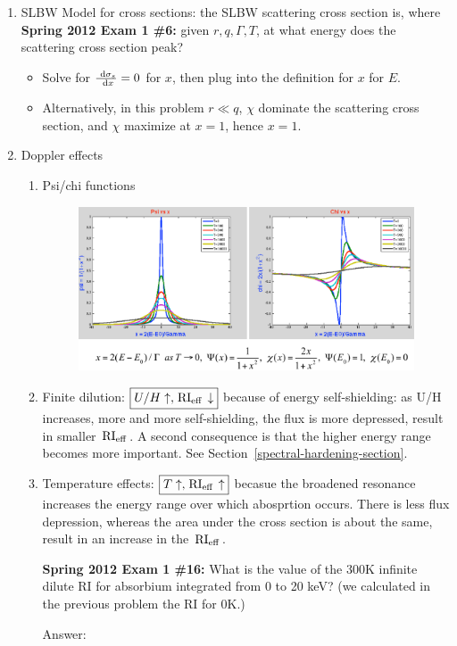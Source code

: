 \documentclass{school-22.211-notes}
\begin{document}
\clearpage
{} 
\begin{enumerate}
\item SLBW Model for cross sections: the SLBW scattering cross section is, 
  where 
  \textbf{Spring 2012 Exam 1 \#6:} given $r,q, \Gamma,T$, at what energy does the scattering cross section peak? 
  \begin{itemize}
  \item Solve for $\frac{\mbox{ }\mathrm{d} \sigma_s}{\mbox{ }\mathrm{d} x} = 0$ for $x$, then plug into the definition for $x$ for $E$.
  \item Alternatively, in this problem $r \ll q$, $\chi$ dominate the scattering cross section, and $\chi$ maximize at $x=1$, hence $x=1$. 
  \end{itemize}

\item Doppler effects
  \begin{enumerate}
    \item Psi/chi functions

      \begin{figure}[ht]
        \centering
        \includegraphics[width=6in]{images/r-m/psi-chi-plot.png}
      \end{figure}

    \item Finite dilution: $\boxed{U/H \uparrow, \left. \mathrm{RI}_{\mathrm{eff}} \right. \downarrow}$ because of energy self-shielding: as U/H increases, more and more self-shielding, the flux is more depressed, result in smaller $\left. \mathrm{RI}_{\mathrm{eff}} \right.$. A second consequence is that the higher energy range becomes more important. See Section~\ref{spectral-hardening-section}. 
    \item Temperature effects: $\boxed{T \uparrow, \left. \mathrm{RI}_{\mathrm{eff}} \right. \uparrow}$ becasue the broadened resonance increases the energy range over which abosprtion occurs. There is less flux depression, whereas the area under the cross section is about the same, result in an increase in the $\left. \mathrm{RI}_{\mathrm{eff}} \right.$. 

\textbf{Spring 2012 Exam 1 \#16:} What is the value of the 300K infinite dilute RI for absorbium integrated from 0 to 20 keV? (we calculated in the previous problem the RI for 0K.)

Answer: 
  \end{enumerate}
\end{enumerate}
\end{document}
